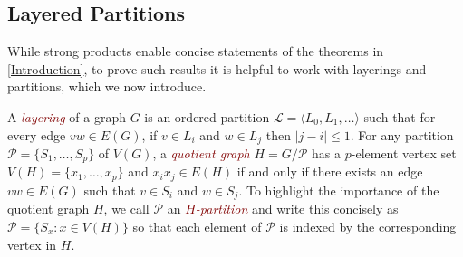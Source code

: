 \documentclass{patmorin}
\theoremstyle{plain}
\newtheorem{thm}{Theorem}
\theoremstyle{definition}
\newcommand{\defin}[1]{\textcolor{Maroon}{\emph{#1}}}
\newcommand{\note}[2]{\noindent{\color{red}[#1:~#2]}}
\DeclareMathOperator{\dist}{dist}
\newcommand{\PP}{\mathcal{P}}
\renewcommand{\SS}{\mathcal{S}}
\renewcommand{\geq}{\geqslant}
\renewcommand{\leq}{\leqslant}
\begin{document}





\subsection{Layered Partitions}
\label{LayeredPartitions}

While strong products enable concise statements of the theorems in \cref{Introduction}, to prove such results it is helpful to work with layerings and partitions, which we now introduce.

A \defin{layering} of a graph $G$
is an ordered partition $\mathcal{L}=\langle L_0,L_1,\ldots\rangle $ such that for every edge
$vw\in E(G)$, if $v\in L_i$ and $w\in L_j$ then $|j-i|\leq 1$.  For any partition $\PP=\{S_1,\ldots,S_p\}$ of $V(G)$, a \defin{quotient graph} $H=G/\PP$ has a $p$-element vertex set $V(H)=\{x_1,\ldots,x_p\}$ and $x_ix_j\in E(H)$ if and only if there exists an edge $vw\in E(G)$ such that $v\in S_i$ and $w\in S_j$. To highlight the importance of the quotient graph $H$, we call $\PP$ an \defin{$H$-partition} and write this concisely as $\PP=\{S_x : x\in V(H)\}$ so that each element of $\PP$ is indexed by the corresponding vertex in $H$.
\end{document}
